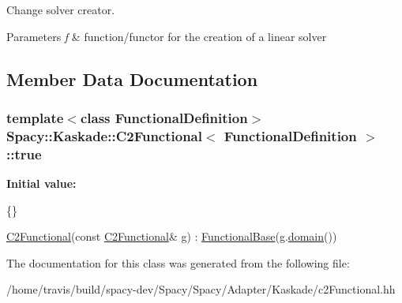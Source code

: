 Change solver creator. 


\begin{DoxyParams}{Parameters}
{\em f} & function/functor for the creation of a linear solver \\
\hline
\end{DoxyParams}


\subsection{Member Data Documentation}
\hypertarget{classSpacy_1_1Kaskade_1_1C2Functional_a4f225221bbaf1f2e9707b7c11d5ba16d}{
\subsubsection[{true}]{\setlength{\rightskip}{0pt plus 5cm}template$<$class Functional\-Definition$>$ {\bf Spacy\-::\-Kaskade\-::\-C2\-Functional}$<$ Functional\-Definition $>$\-::true}}\label{classSpacy_1_1Kaskade_1_1C2Functional_a4f225221bbaf1f2e9707b7c11d5ba16d}
{\bfseries Initial value\-:}
\begin{DoxyCode}
\{\}


            
            \hyperlink{classSpacy_1_1Kaskade_1_1C2Functional_a35511ed1de0b2599efa901f27793dbdc}{C2Functional}(\textcolor{keyword}{const} \hyperlink{classSpacy_1_1Kaskade_1_1C2Functional_a35511ed1de0b2599efa901f27793dbdc}{C2Functional}& g)
                : \hyperlink{classSpacy_1_1FunctionalBase_aa655b0f2b96f02a3137dad89e3f0d2ac}{FunctionalBase}(g.\hyperlink{classSpacy_1_1FunctionalBase_a2d3397deb9fa1ad85ed04e37a03b3aa6}{domain}())
\end{DoxyCode}


The documentation for this class was generated from the following file\-:\begin{DoxyCompactItemize}
\item 
/home/travis/build/spacy-\/dev/\-Spacy/\-Spacy/\-Adapter/\-Kaskade/c2\-Functional.\-hh\end{DoxyCompactItemize}
